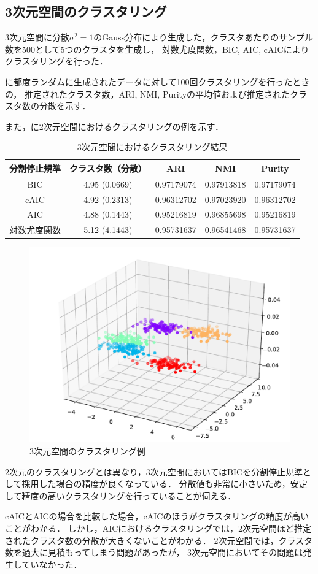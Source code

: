 \subsection{3次元空間のクラスタリング}

3次元空間に分散$\sigma^2=1$のGauss分布により生成した，クラスタあたりのサンプル数を500として5つのクラスタを生成し，
対数尤度関数，BIC, AIC, cAICによりクラスタリングを行った．

に都度ランダムに生成されたデータに対して100回クラスタリングを行ったときの，
推定されたクラスタ数，ARI, NMI, Purityの平均値および推定されたクラスタ数の分散を示す．

また，に2次元空間におけるクラスタリングの例を示す．

\begin{table}[htb]
  \centering
  \caption{3次元空間におけるクラスタリング結果}
  \label{table:3dim}
  \begin{tabular}{|c|c|c|c|c|} \hline
    分割停止規準 & クラスタ数（分散） & ARI & NMI & Purity \\\hline
    BIC & 4.95 (0.0669) & 0.97179074 & 0.97913818 & 0.97179074\\
    cAIC & 4.92 (0.2313) & 0.96312702 & 0.97023920 & 0.96312702\\
    AIC & 4.88 (0.1443) & 0.95216819 & 0.96855698 & 0.95216819\\
    対数尤度関数 & 5.12 (4.1443) & 0.95731637 & 0.96541468 & 0.95731637\\\hline 
  \end{tabular}
\end{table}

\begin{figure}[htbp]
  \begin{center}
    \includegraphics[width=0.7\linewidth]{./img/BIC_3.pdf}
      \caption{3次元空間のクラスタリング例}
      \label{fig:3dim}
  \end{center}
\end{figure}
2次元のクラスタリングとは異なり，3次元空間においてはBICを分割停止規準として採用した場合の精度が良くなっている．
分散値も非常に小さいため，安定して精度の高いクラスタリングを行っていることが伺える．

cAICとAICの場合を比較した場合，cAICのほうがクラスタリングの精度が高いことがわかる．
しかし，AICにおけるクラスタリングでは，2次元空間ほど推定されたクラスタ数の分散が大きくないことがわかる．
2次元空間では，クラスタ数を過大に見積もってしまう問題があったが，
3次元空間においてその問題は発生していなかった．

